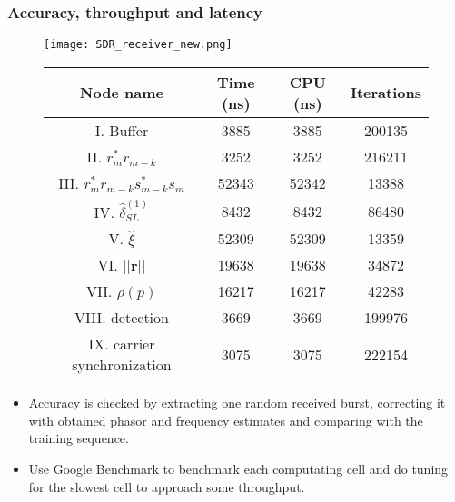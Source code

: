   \begin{frame}
    \frametitle{Accuracy, throughput and latency}

    \begin{figure}
        \centering
        \begin{minipage}{.3\textwidth}
          \centering
          \texttt{[image: SDR\_receiver\_new.png]}
        \end{minipage}%
        \begin{minipage}{.7\textwidth}
          \centering
          \begin{table}[t]
            \tiny
            \centering %
            \begin{tabular}{c c c c} %
            \hline\hline %
            Node name & Time (ns) & CPU (ns) & Iterations \\ [0.5ex] %
            \hline %
            I. Buffer  & 3885 & 3885 & 200135 \\ %
            II. $r_m^*r_{m-k}$  & 3252 & 3252 & 216211 \\
            III. $r_m^*r_{m-k}s_{m-k}^*s_m$ & 52343 & 52342 & 13388 \\
            IV. $\hat{\delta}_{SL}^{(1)}$ & 8432 & 8432 & 86480 \\
            V. $\hat{\xi}$ & 52309 & 52309 & 13359 \\
            VI. $||\bm{r}||$ & 19638 & 19638 & 34872 \\ %
            VII. $\rho(p)$ & 16217 & 16217 & 42283 \\
            VIII. detection & 3669 & 3669 & 199976 \\
            IX. carrier synchronization & 3075 & 3075 & 222154  \\ [1ex]
            \hline
            \end{tabular}
            \label{table:BM_function_nodes} %
          \end{table}
        
        \end{minipage}
    \end{figure}

    \begin{itemize}
        \item Accuracy is checked by extracting one random received burst, correcting it with obtained phasor and frequency estimates and comparing with the training sequence.
        \item Use Google Benchmark to benchmark each computating cell and do tuning for the slowest cell to approach some throughput.
    \end{itemize}
  \end{frame}


